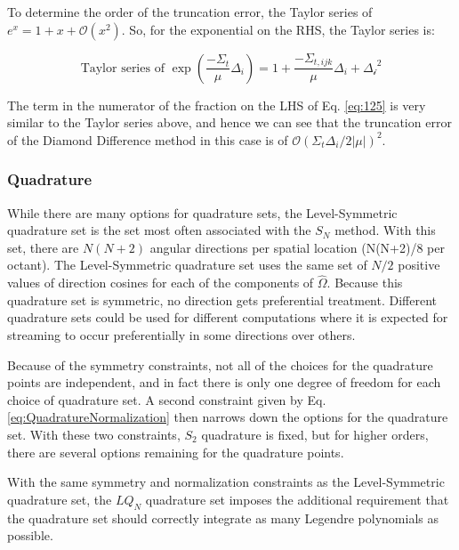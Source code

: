 \documentclass[10pt]{article}
\newcommand{\hO}{\hat{\Omega}}
\newcounter{subsubsubsection}[subsubsection]
\begin{document}
\begin{flushleft}
\begin{tcolorbox}[breakable]
To determine the order of the truncation error, the Taylor series of \(e^x=1+x+\mathscr{O}(x^2)\). So, for the exponential on the RHS, the Taylor series is:

\begin{equation}
\text{Taylor series of } \exp{\left(\frac{-\Sigma_t}{\mu}\Delta_i\right)}=1+\frac{-\Sigma_{t,ijk}}{\mu}\Delta_i+\mathscr{\Delta_i}^2
\end{equation}

The term in the numerator of the fraction on the LHS of Eq. \eqref{eq:125} is very similar to the Taylor series above, and hence we can see that the truncation error of the Diamond Difference method in this case is of \(\mathscr{O}(\Sigma_t\Delta_i/2|\mu|)^2\). 

\end{tcolorbox}

\subsubsection{Quadrature}

While there are many options for quadrature sets, the Level-Symmetric quadrature set is the set most often associated with the \(S_N\) method. With this set, there are \(N(N+2)\) angular directions per spatial location (N(N+2)/8 per octant). The Level-Symmetric quadrature set uses the same set of \(N/2\) positive values of direction cosines for each of the components of \(\hO  \). Because this quadrature set is symmetric, no direction gets preferential treatment. Different quadrature sets could be used for different computations where it is expected for streaming to occur preferentially in some directions over others. 

Because of the symmetry constraints, not all of the choices for the quadrature points are independent, and in fact there is only one degree of freedom for each choice of quadrature set. A second constraint given by Eq. \eqref{eq:QuadratureNormalization} then narrows down the options for the quadrature set. With these two constraints, \(S_2\) quadrature is fixed, but for higher orders, there are several options remaining for the quadrature points. 


With the same symmetry and normalization constraints as the Level-Symmetric quadrature set, the \(LQ_N\) quadrature set imposes the additional requirement that the quadrature set should correctly integrate as many Legendre polynomials as possible. 


\end{flushleft}
\end{document}
